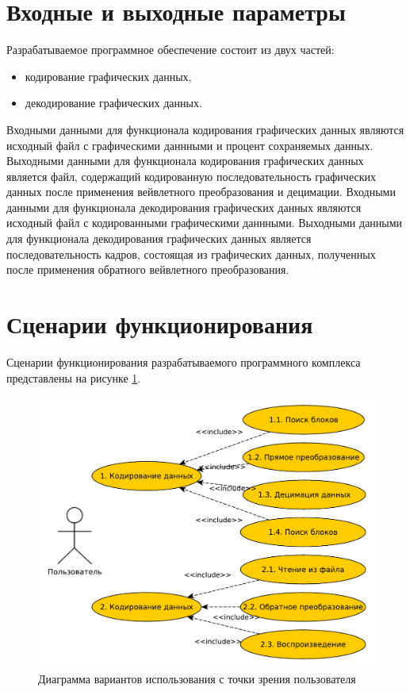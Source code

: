 \section{Входные и выходные параметры}
Разрабатываемое программное обеспечение состоит из двух частей:
\begin{itemize}
 \item кодирование графических данных,
 \item декодирование графических данных.
\end{itemize}
Входными данными для функционала кодирования графических данных являются исходный файл с графическими даннными и процент сохраняемых данных.
Выходными данными для функционала кодирования графических данных является файл, содержащий кодированную последовательность графических данных после
применения вейвлетного преобразования и децимации.
Входными данными для функционала декодирования графических данных являются исходный файл с кодированными графическими даннными.
Выходными данными для функционала декодирования графических данных является последовательность кадров, состоящая из графических данных, полученных после применения 
обратного вейвлетного преобразования.

\section{Сценарии функционирования}
Сценарии функционирования разрабатываемого программного комплекса представлены на рисунке \ref{fig:uml1}.

\begin{figure}[ht]
  \centering
  \includegraphics[scale=0.65]{inc/graphics/uml1.pdf}
  \caption{Диаграмма вариантов использования с точки зрения пользователя}
  \label{fig:uml1}
\end{figure}


